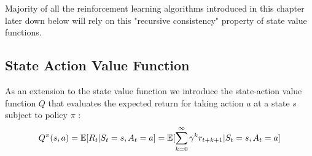 


Majority of all the reinforcement learning algorithms introduced in this chapter later down below will rely on this "recursive consistency" \cite{lecture_mdp} property of state value functions. 


\subsection{State Action Value Function}
As an extension to the state value function we introduce the state-action value function $Q$ that evaluates the expected return for taking action $a$ at a state $s$ subject to policy $\pi$ \cite{lecture_mdp} :
\begin{align}
    Q^{\pi}(s, a) = \operatorname{\mathbb{E}}[R_t | S_t = s, A_t = a] = \operatorname{\mathbb{E}}[\sum^{\infty}_{k=0} \gamma^k r_{t+k+1} | S_t = s, A_t = a]
\end{align}

